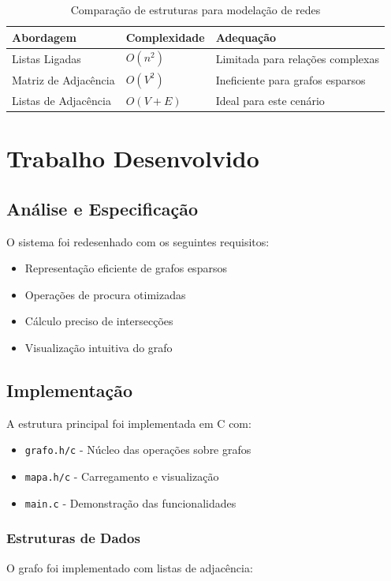 \documentclass[a4paper,12pt]{report}
\begin{document}
\begin{table}[H]
\centering
\begin{tabular}{lll}
\toprule
\textbf{Abordagem} & \textbf{Complexidade} & \textbf{Adequação} \\
\midrule
Listas Ligadas & \(O(n^2)\) & Limitada para relações complexas \\
Matriz de Adjacência & \(O(V^2)\) & Ineficiente para grafos esparsos \\
Listas de Adjacência & \(O(V+E)\) & Ideal para este cenário \\
\bottomrule
\end{tabular}
\caption{Comparação de estruturas para modelação de redes}
\label{tab:comparativo_grafos}
\end{table}

\chapter{Trabalho Desenvolvido}
\section{Análise e Especificação}
O sistema foi redesenhado com os seguintes requisitos:

\begin{itemize}
    \item Representação eficiente de grafos esparsos
    \item Operações de procura otimizadas
    \item Cálculo preciso de intersecções
    \item Visualização intuitiva do grafo
\end{itemize}

\section{Implementação}
A estrutura principal foi implementada em C com:

\begin{itemize}
    \item \texttt{grafo.h/c} - Núcleo das operações sobre grafos
    \item \texttt{mapa.h/c} - Carregamento e visualização
    \item \texttt{main.c} - Demonstração das funcionalidades
\end{itemize}

\subsection{Estruturas de Dados}
O grafo foi implementado com listas de adjacência:
\end{document}
